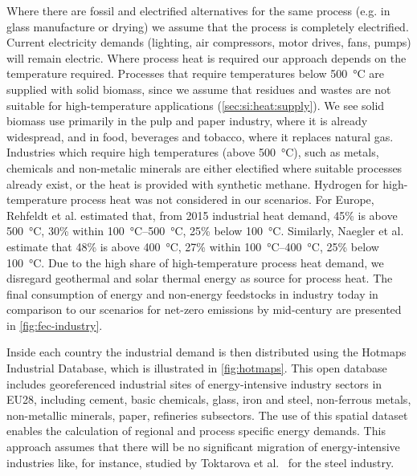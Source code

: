 Where there are fossil and electrified alternatives for the same process (e.g.
in glass manufacture or drying) we assume that the process is completely
electrified. Current electricity demands (lighting, air compressors, motor
drives, fans, pumps) will remain electric. Where process heat is required our
approach depends on the temperature required.
Processes that require temperatures below \SI{500}{\celsius} are supplied with
solid biomass, since we assume that residues and wastes are not suitable for
high-temperature applications (\cref{sec:si:heat:supply}). We see solid biomass
use primarily in the pulp and paper industry, where it is already widespread,
and in food, beverages and tobacco, where it replaces natural gas. Industries
which require high temperatures (above \SI{500}{\celsius}), such as metals,
chemicals and non-metalic minerals are either electified where suitable
processes already exist, or the heat is provided with synthetic methane.
Hydrogen for high-temperature process heat was not considered in our
scenarios. For Europe, Rehfeldt et al.
 estimated that, from 2015 industrial heat
demand, 45\% is above \SI{500}{\celsius}, 30\% within
\SIrange{100}{500}{\celsius}, 25\% below \SI{100}{\celsius}. Similarly, Naegler
et al.  estimate that 48\% is above
\SI{400}{\celsius}, 27\% within \SIrange{100}{400}{\celsius}, 25\% below
\SI{100}{\celsius}. Due to the high share of high-temperature process heat
demand, we disregard geothermal and solar thermal energy as source for process
heat. The final consumption of energy and non-energy feedstocks in industry
today in comparison to our scenarios for net-zero emissions by mid-century are
presented in \cref{fig:fec-industry}.

Inside each country the industrial demand is then distributed using the Hotmaps
Industrial Database, which is illustrated in \cref{fig:hotmaps}. This open database includes
georeferenced industrial sites of energy-intensive industry sectors in EU28,
including cement, basic chemicals, glass, iron and steel, non-ferrous metals,
non-metallic minerals, paper, refineries subsectors. The use of this spatial
dataset enables the calculation of regional and process specific energy demands.
This approach assumes that there will be no significant migration of
energy-intensive industries like, for instance, studied by Toktarova et
al.~ for the steel industry.

